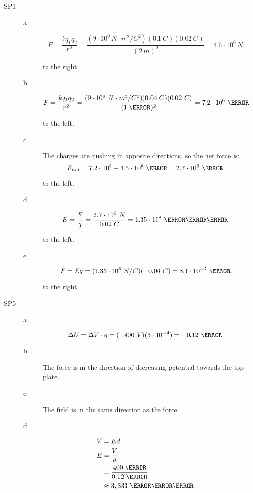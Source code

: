 \documentclass{exam}
\begin{document}
\begin{description}

\item[SP1]

\begin{description}
\item[a]
\[
  F = \frac{kq_1q_2}{r^2} = \frac{(9 \cdot 10^9 \ N \cdot m^2/C^2)(0.1 \ C)(0.02 \ C)}{(2 \ m)^2} = 4.5 \cdot 10^6 \ N
\]

to the right.

\item[b]
\[
  F = \frac{kq_1q_2}{r^2} = \frac{(9 \cdot 10^9 \ N \cdot m^2/C^2)(0.04 \ C)(0.02 \ C)}{(1 \ \meter)^2} = 7.2 \cdot 10^6 \ \newton
\]

to the left.

\item[c]
The charges are pushing in opposite directions, so the net force is:
\[
  F_{net} = 7.2 \cdot 10^6 - 4.5 \cdot 10^6 \ \newton = 2.7 \cdot 10^6 \ \newton
\]

to the left.

\item[d]
\[
  E = \frac{F}{q} = \frac{2.7 \cdot 10^6 \ N}{0.02 \ C} = 1.35 \cdot 10^8 \ \newton \per \coulomb \\
\]

to the left.

\item[e]
\[
  F = Eq = (1.35 \cdot 10^8 \ N/C)(-0.06 \ C) = 8.1 \cdot 10^{-7} \ \newton
\]

to the right.

\end{description}
\item[SP5]

\begin{description}
\item[a]
\[
  \Delta U = \Delta V \cdot q = (-400 \ V)(3 \cdot 10^{-4}) = -0.12 \ \joule
\]

\item[b]
The force is in the direction of decreasing potential towards the top plate.

\item[c]
The field is in the same direction as the force.

\item[d]
\begin{align*}
  V &= Ed \\
  E &= \frac{V}{d} \\
    &= \frac{400 \ \volt}{0.12 \ \meter} \\
    &\approx 3,333 \ \volt \per \meter \\
\end{align*}

\end{description}

\end{description}
\fi
\end{document}
